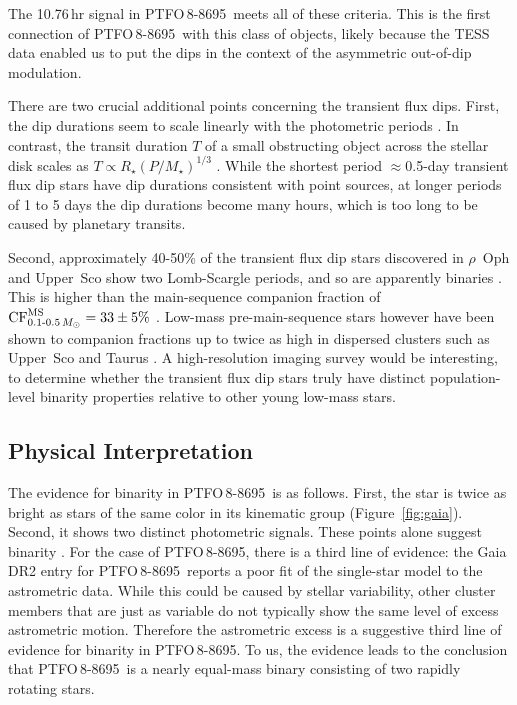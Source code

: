 \documentclass[12pt,twocolumn,tighten]{aastex62}
\newcommand{\ptfo}{PTFO$\,$8-8695}
\begin{document}
The 10.76$\,$hr signal in \ptfo\ meets all of these criteria.  This is
the first connection of \ptfo\ with this class of objects, likely
because the TESS data enabled us to put the dips in the context of the
asymmetric out-of-dip modulation.

There are two crucial additional points concerning the transient flux
dips.  First, the dip durations seem to scale linearly with the
photometric periods \citep[][Figure~26]{stauffer_orbiting_2017}.  In
contrast, the transit duration $T$ of a small obstructing object
across the stellar disk scales as $T \propto R_\star
(P/M_\star)^{1/3}$ \citep{winn_exoplanet_2010}.  While the shortest
period $\approx$0.5-day transient flux dip stars have dip durations
consistent with point sources, at longer periods of 1 to 5 days the
dip durations become many hours, which is too long to be caused by
planetary transits.

Second, approximately 40-50\% of the transient flux dip stars
discovered in $\rho$~Oph and Upper~Sco show two Lomb-Scargle periods,
and so are apparently binaries
\citep[][Table~1]{stauffer_orbiting_2017}.  This is higher than the
main-sequence companion fraction of ${\rm
CF}_{0.1\text{-}0.5\,M_\odot}^{\rm MS} = 33 \pm 5\%$
\citep{henry_solar_2006,duchene_stellar_2013,winters_solar_2019}.
Low-mass pre-main-sequence stars however have been shown to companion
fractions up to twice as high in dispersed clusters such as Upper~Sco
and Taurus \citep{kraus_mapping_2008,kraus_mapping_2011}.  A
high-resolution imaging survey would be interesting, to determine
whether the transient flux dip stars truly have distinct
population-level binarity properties relative to other young low-mass
stars.


\subsection{Physical Interpretation}
\label{subsec:physical}

The evidence for binarity in \ptfo\ is as follows.  First, the star is
twice as bright as stars of the same color in its kinematic group
(Figure~\ref{fig:gaia}).  Second, it shows two distinct photometric
signals.  These points alone suggest binarity
\citep{stauffer_rotevol_2018}.  For the case of \ptfo, there is a
third line of evidence: the Gaia DR2 entry for \ptfo\ reports a poor
fit of the single-star model to the astrometric data.  While this
could be caused by stellar variability, other cluster members that are
just as variable do not typically show the same level of excess
astrometric motion.  Therefore the astrometric excess is a suggestive
third line of evidence for binarity in \ptfo. To us, the evidence
leads to the conclusion that \ptfo\ is a nearly equal-mass binary
consisting of two rapidly rotating stars.
\end{document}
